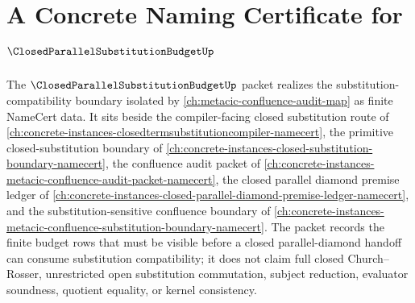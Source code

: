 \chapter{A Concrete Naming Certificate for $\ClosedParallelSubstitutionBudgetUp$}
\label{ch:concrete-instances-closed-parallel-substitution-budget-namecert}

The $\ClosedParallelSubstitutionBudgetUp$ packet realizes the substitution-compatibility boundary isolated by \autoref{ch:metacic-confluence-audit-map} as finite NameCert data. It sits beside the compiler-facing closed substitution route of \autoref{ch:concrete-instances-closedtermsubstitutioncompiler-namecert}, the primitive closed-substitution boundary of \autoref{ch:concrete-instances-closed-substitution-boundary-namecert}, the confluence audit packet of \autoref{ch:concrete-instances-metacic-confluence-audit-packet-namecert}, the closed parallel diamond premise ledger of \autoref{ch:concrete-instances-closed-parallel-diamond-premise-ledger-namecert}, and the substitution-sensitive confluence boundary of \autoref{ch:concrete-instances-metacic-confluence-substitution-boundary-namecert}. The packet records the finite budget rows that must be visible before a closed parallel-diamond handoff can consume substitution compatibility; it does not claim full closed Church--Rosser, unrestricted open substitution commutation, subject reduction, evaluator soundness, quotient equality, or kernel consistency.

